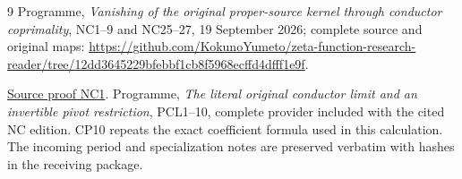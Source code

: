 \documentclass[11pt]{article}
\begin{document}
\begin{thebibliography}{9}
 Programme, \emph{Vanishing of the original proper-source
kernel through conductor coprimality}, NC1--9 and NC25--27,
19 September 2026; complete source and original maps:
\url{https://github.com/KokunoYumeto/zeta-function-research-reader/tree/12dd3645229bfebbf1cb8f5968ecffd4dfff1e9f}.

\href{https://github.com/KokunoYumeto/zeta-function-research-reader/blob/5992ad50c0f2a06921f1fcaded7b4e38097c0739/workbenches/splitzero-tandem/continuations/20260920-original-kernel-mixed-determinants/providers/ORIGINAL_CONDUCTOR_COPRIMALITY.tex\#L41}{Source proof NC1}.
 Programme, \emph{The literal original conductor limit
and an invertible pivot restriction}, PCL1--10, complete provider
included with the cited NC edition. CP10 repeats the exact coefficient
formula used in this calculation. The incoming period and specialization
notes are preserved verbatim with hashes in the receiving package.
\end{thebibliography}
\end{document}
